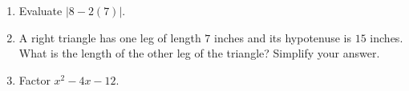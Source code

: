 \documentclass{article}
\begin{document}
\begin{enumerate}

\item Evaluate $|8-2(7)|$.

        \begin{enumerate}
        \end{enumerate}



\item A right triangle has one leg of length $7$ inches and its hypotenuse is $15$ inches. What is the length of the other leg of the triangle? Simplify your answer.

        \begin{enumerate}
        \end{enumerate}



\item Factor $x^2-4x-12$.

        \begin{enumerate}
        \end{enumerate}




\end{enumerate}
\end{document}
